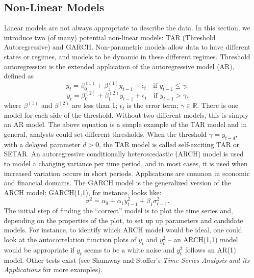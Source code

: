 \subsection{Non-Linear Models}
Linear models are not always appropriate to describe the data. In this section, we introduce two (of many) potential non-linear models: TAR (Threshold Autoregressive) and GARCH.
Non-parametric models allow data to have different states or regimes, and models to be dynamic in these different regimes. 
\newl Threshold autoregression is the extended application of the autoregressive model (AR), defined as 
\begin{equation*}
y_t = \beta^{(1)}_0 + \beta^{(1)}_1y_{t-1}+ \epsilon_t\quad \text{if }y_{t-1} \leqslant \gamma; 
\end{equation*}
\begin{equation*} 
y_t = \beta^{(2)}_0 + \beta^{(2)}_1y_{t-1}+ \epsilon_t\quad \text{if }y_{t-1} > \gamma.
\end{equation*}
where $\beta^{(1)}$ and $\beta^{(2)}$ are less than 1; $\epsilon_t$ is the error term; $\gamma \in \mathbb{R} $. There is one model for
each side of the threshold. Without two different models, this is simply an AR model.
The above equation is a simple example of the TAR model and in general, analysts could set different thresholds. When the threshold $ \gamma = y_{t-d} $, with a delayed parameter $d>0$, the TAR model is called self-exciting TAR or SETAR. 
\newl An autoregressive conditionally heteroscedastic (ARCH) model is used to model a changing variance per time period, and in most cases, it is used when increased variation occurs in short periods. Applications are common in economic and financial domains. The GARCH model is the generalized version of the ARCH model; GARCH(1,1), for instance, looks like:
\begin{equation*}
    \sigma^2 = \alpha_0 + \alpha_1 y^2_{t-1} + \beta_1 \sigma^2_{t-1}.
\end{equation*}
The initial step of finding the ``correct'' model is to plot the time series and, depending on the properties of the plot, to set up up parameters and candidate models. For instance, to identify which ARCH model would be ideal, one could look at the autocorrelation function plots of $y_t$ and $y^2_t$ -- an ARCH(1,1) model would be appropriate if $y_t$ seems to be a white noise and $y^2_t$ follows an AR(1) model. Other tests exist (see Shumway and Stoffer's \textit{Time Series Analysis and its Applications} for more examples). 

